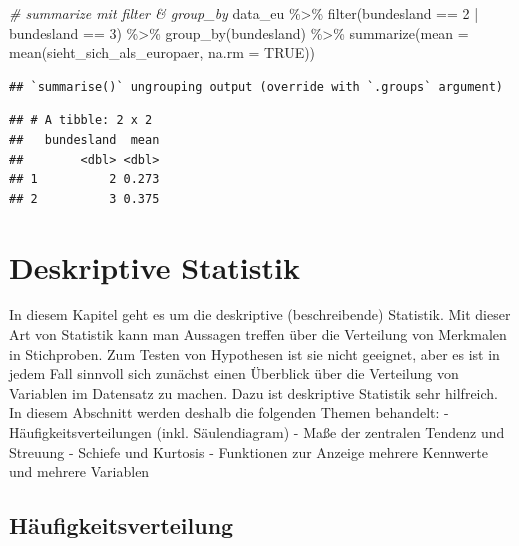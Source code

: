 \documentclass[
]{book}
\newenvironment{Shaded}{\begin{snugshade}}{\end{snugshade}}
\newcommand{\AttributeTok}[1]{\textcolor[rgb]{0.77,0.63,0.00}{#1}}
\newcommand{\CommentTok}[1]{\textcolor[rgb]{0.56,0.35,0.01}{\textit{#1}}}
\newcommand{\ConstantTok}[1]{\textcolor[rgb]{0.00,0.00,0.00}{#1}}
\newcommand{\DecValTok}[1]{\textcolor[rgb]{0.00,0.00,0.81}{#1}}
\newcommand{\FunctionTok}[1]{\textcolor[rgb]{0.00,0.00,0.00}{#1}}
\newcommand{\NormalTok}[1]{#1}
\newcommand{\SpecialCharTok}[1]{\textcolor[rgb]{0.00,0.00,0.00}{#1}}
\begin{document}
\begin{Shaded}
\begin{Highlighting}[]
\CommentTok{\# summarize mit filter \& group\_by}
\NormalTok{data\_eu }\SpecialCharTok{\%\textgreater{}\%}
  \FunctionTok{filter}\NormalTok{(bundesland }\SpecialCharTok{==} \DecValTok{2} \SpecialCharTok{|}\NormalTok{ bundesland }\SpecialCharTok{==} \DecValTok{3}\NormalTok{) }\SpecialCharTok{\%\textgreater{}\%} 
  \FunctionTok{group\_by}\NormalTok{(bundesland) }\SpecialCharTok{\%\textgreater{}\%} 
  \FunctionTok{summarize}\NormalTok{(}\AttributeTok{mean =} \FunctionTok{mean}\NormalTok{(sieht\_sich\_als\_europaer, }\AttributeTok{na.rm =} \ConstantTok{TRUE}\NormalTok{))}
\end{Highlighting}
\end{Shaded}

\begin{verbatim}
## `summarise()` ungrouping output (override with `.groups` argument)
\end{verbatim}

\begin{verbatim}
## # A tibble: 2 x 2
##   bundesland  mean
##        <dbl> <dbl>
## 1          2 0.273
## 2          3 0.375
\end{verbatim}

\hypertarget{deskriptive-statistik}{%
\chapter{Deskriptive Statistik}\label{deskriptive-statistik}}

In diesem Kapitel geht es um die deskriptive (beschreibende) Statistik. Mit dieser Art von Statistik kann man Aussagen treffen über die Verteilung von Merkmalen in Stichproben. Zum Testen von Hypothesen ist sie nicht geeignet, aber es ist in jedem Fall sinnvoll sich zunächst einen Überblick über die Verteilung von Variablen im Datensatz zu machen. Dazu ist deskriptive Statistik sehr hilfreich. In diesem Abschnitt werden deshalb die folgenden Themen behandelt:
- Häufigkeitsverteilungen (inkl. Säulendiagram)
- Maße der zentralen Tendenz und Streuung
- Schiefe und Kurtosis
- Funktionen zur Anzeige mehrere Kennwerte und mehrere Variablen

\hypertarget{huxe4ufigkeitsverteilung}{%
\section{Häufigkeitsverteilung}\label{huxe4ufigkeitsverteilung}}
\end{document}

